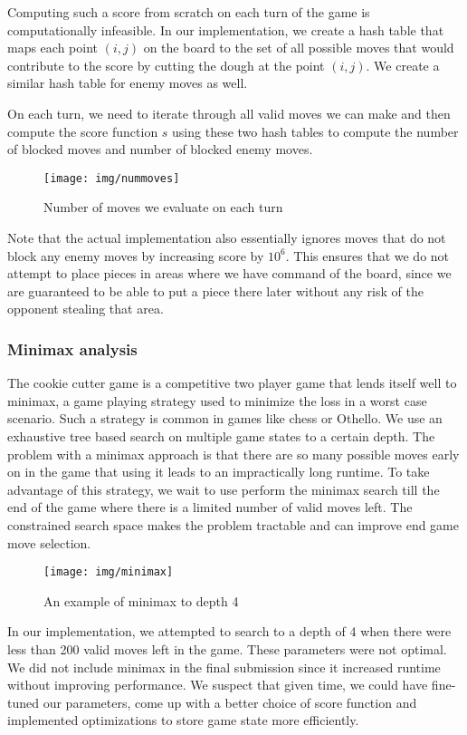 \documentclass{scrartcl}
\begin{document}
Computing such a score from scratch on each turn of the game is computationally infeasible. In our implementation, we create a hash table that maps each point $(i,j)$ on the board to the set of all possible moves that would contribute to the score by cutting the dough at the point $(i,j)$. We create a similar hash table for enemy moves as well.

On each turn, we need to iterate through all valid moves we can make and then compute the score function $s$ using these two hash tables to compute the number of blocked moves and number of blocked enemy moves.

\begin{figure}
\centering
\texttt{[image: img/nummoves]}
\caption{Number of moves we evaluate on each turn}
\label{fig:nummoves}
\end{figure}

Note that the actual implementation also essentially ignores moves that do not block any enemy moves by increasing score by $10^6$. This ensures that we do not attempt to place pieces in areas where we have command of the board, since we are guaranteed to be able to put a piece there later without any risk of the opponent stealing that area.

\subsubsection{Minimax analysis} %
The cookie cutter game is a competitive two player game that lends itself well to minimax, a game playing strategy used to minimize the loss in a worst case scenario. Such a strategy is common in games like chess or Othello. We use an exhaustive tree based search on multiple game states to a certain depth. The problem with a minimax approach is that there are so many possible moves early on in the game that using it leads to an impractically long runtime. To take advantage of this strategy, we wait to use perform the minimax search till the end of the game where there is a limited number of valid moves left. The constrained search space makes the problem tractable and can improve end game move selection.

\begin{figure}
\centering
\texttt{[image: img/minimax]}
\caption{An example of minimax to depth 4}
\label{fig:minimax}
\end{figure}

In our implementation, we attempted to search to a depth of 4 when there were less than 200 valid moves left in the game. These parameters were not optimal. We did not include minimax in the final submission since it increased runtime without improving performance. We suspect that given time, we could have fine-tuned our parameters, come up with a better choice of score function and implemented optimizations to store game state more efficiently.
\end{document}
